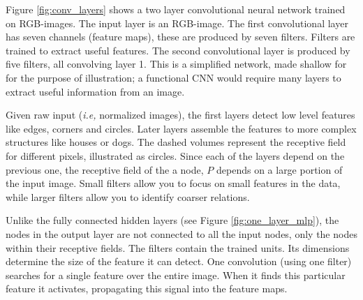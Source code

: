 Figure \ref{fig:conv_layers} shows a two layer convolutional neural network trained on RGB-images. The input layer is an RGB-image. The first convolutional layer has seven channels (feature maps), these are produced by seven filters. Filters are trained to extract useful features. The second convolutional layer is produced by five filters, all convolving layer 1. This is a simplified network, made shallow for for the purpose of illustration; a functional CNN would require many layers to extract useful information from an image. %

Given raw input (\textit{i.e,} normalized images), the first layers detect low level features like edges, corners and circles. Later layers assemble the features to more complex structures like houses or dogs. The dashed volumes represent the receptive field for different pixels, illustrated as circles. Since each of the layers depend on the previous one, the receptive field of the a node, $P$ depends on a large portion of the input image. Small filters allow you to focus on small features in the data, while larger filters allow you to identify coarser relations.

Unlike the fully connected hidden layers (see Figure \ref{fig:one_layer_mlp}), the nodes in the output layer are not connected to all the input nodes, only the nodes within their receptive fields. The filters contain the trained units. Its dimensions determine the size of the feature it can detect. One convolution (using one filter) searches for a single feature over the entire image. When it finds this particular feature it activates, propagating this signal into the feature maps.


